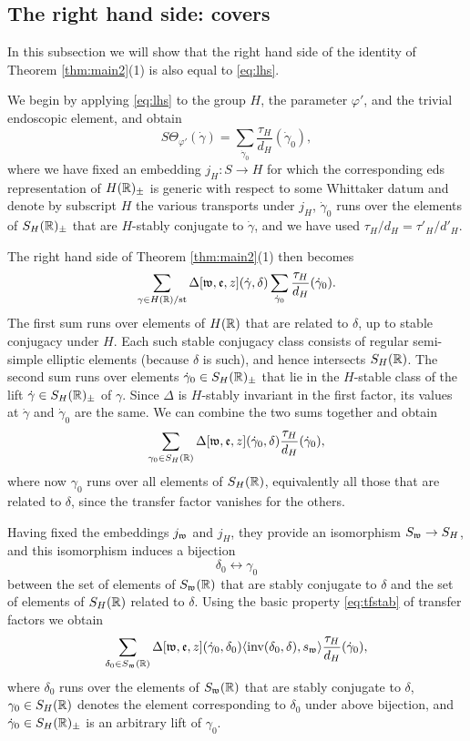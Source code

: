 \documentclass{article}
\theoremstyle{definition}
\numberwithin{equation}{section}
\renewcommand{\-}{\hyp{}}
\begin{document}
\subsection{The right hand side: covers} \label{sub:rhs_cover}

In this subsection we will show that the right hand side of the identity of Theorem \ref{thm:main2}(1) is also equal to \eqref{eq:lhs}.

We begin by applying \eqref{eq:lhs} to the group $H$, the parameter $\varphi'$, and the trivial endoscopic element, and obtain
\[ S\Theta_{\varphi'}(\dot\gamma) = \sum_{\dot\gamma_0} \frac{\tau_H}{d_{H}}(\dot\gamma_0), \]
where we have fixed an embedding $j_H : S \to H$ for which the corresponding eds representation of $H(\mathbb{R})_\pm$ is generic with respect to some Whittaker datum and denote by subscript $H$ the various transports under $j_H$, $\dot\gamma_0$ runs over the elements of $S_H(\mathbb{R})_\pm$ that are $H$-stably conjugate to $\dot\gamma$, and we have used $\tau_H/d_H=\tau'_H/d'_H$.

The right hand side of Theorem \ref{thm:main2}(1) then becomes
\[ \sum_{\gamma \in H(\mathbb{R})/\textrm{st}} \Delta[\mathfrak{w},\mathfrak{e},z](\dot\gamma,\delta)\sum_{\dot\gamma_0} \frac{\tau_H}{d_{H}}(\dot\gamma_0). \]
The first sum runs over elements of $H(\mathbb{R})$ that are related to $\delta$, up to stable conjugacy under $H$. Each such stable conjugacy class consists of regular semi-simple elliptic elements (because $\delta$ is such), and hence intersects $S_H(\mathbb{R})$. The second sum runs over elements $\dot\gamma_0 \in S_H(\mathbb{R})_\pm$ that lie in the $H$-stable class of the lift $\dot\gamma \in S_H(\mathbb{R})_\pm$ of $\gamma$. Since $\Delta$ is $H$-stably invariant in the first factor, its values at $\dot\gamma$ and $\dot\gamma_0$ are the same. We can combine the two sums together and obtain
\[ \sum_{\gamma_0 \in S_H(\mathbb{R})} \Delta[\mathfrak{w},\mathfrak{e},z](\dot\gamma_0,\delta) \frac{\tau_H}{d_{H}}(\dot\gamma_0), \]
where now $\gamma_0$ runs over all elements of $S_H(\mathbb{R})$, equivalently all those that are related to $\delta$, since the transfer factor vanishes for the others.


Having fixed the embeddings $j_{\mathfrak{w}}$ and $j_H$, they provide an isomorphism $S_{\mathfrak{w}} \to S_H$, and this isomorphism induces a bijection
\[ \delta_0 \leftrightarrow \gamma_0 \]
between the set of elements of $S_{\mathfrak{w}}(\mathbb{R})$ that are stably conjugate to $\delta$ and the set of elements of $S_H(\mathbb{R})$ related to $\delta$. Using the basic property \eqref{eq:tfstab} of transfer factors we obtain
\begin{equation} \label{eq:rhs1}
\sum_{\delta_0 \in S_{\mathfrak{w}}(\mathbb{R})} \Delta[\mathfrak{w},\mathfrak{e},z](\dot\gamma_0,\delta_0)\langle\textrm{inv}(\delta_0,\delta),s_{\mathfrak{w}}\rangle \frac{\tau_H}{d_{H}}(\dot\gamma_0),
\end{equation}
where $\delta_0$ runs over the elements of $S_{\mathfrak{w}}(\mathbb{R})$ that are stably conjugate to $\delta$, $\gamma_0 \in S_H(\mathbb{R})$ denotes the element corresponding to $\delta_0$ under above bijection, and $\dot\gamma_0 \in S_H(\mathbb{R})_\pm$ is an arbitrary lift of $\gamma_0$.
\end{document}
